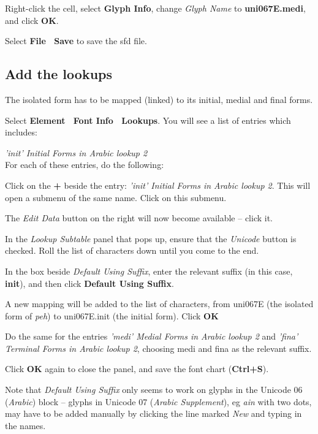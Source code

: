 Right-click the cell, select \textbf{Glyph Info}, change \textit{Glyph Name} to \textbf{uni067E.medi}, and click \textbf{OK}.

Select \textbf{File \textrightarrow\ Save} to save the sfd file.

\subsection{Add the lookups}

The isolated form has to be mapped (linked) to its initial, medial and final forms.

Select \textbf{Element \textrightarrow\ Font Info \textrightarrow\ Lookups}.  You will see a list of entries which includes:

\hangindent=3cm
\textit{'init' Initial Forms in Arabic lookup 2} \\


For each of these entries, do the following:

Click on the \textbf{+} beside the entry: \textit{'init' Initial Forms in Arabic lookup 2}.  This will open a submenu of the same name.  Click on this submenu.

The \textit{Edit Data} button on the right will now become available -- click it.

In the \textit{Lookup Subtable} panel that pops up, ensure that the \textit{Unicode} button is checked.  Roll the list of characters down until you come to the end.

In the box beside \textit{Default Using Suffix}, enter the relevant suffix (in this case, \textbf{init}), and then click \textbf{Default Using Suffix}.

A new mapping will be added to the list of characters, from uni067E (the isolated form of \textit{peh}) to uni067E.init (the initial form).
Click \textbf{OK}

Do the same for the entries \textit{'medi' Medial Forms in Arabic lookup 2} and \textit{'fina' Terminal Forms in Arabic lookup 2}, choosing medi and fina as the relevant suffix.

Click \textbf{OK} again to close the panel, and save the font chart (\textbf{Ctrl+S}).

Note that \textit{Default Using Suffix} only seems to work on glyphs in the Unicode 06 (\textit{Arabic}) block -- glyphs in Unicode 07 (\textit{Arabic Supplement}), eg \textit{ain} with two dots, may have to be added manually by clicking the line marked \textit{New} and typing in the names.

